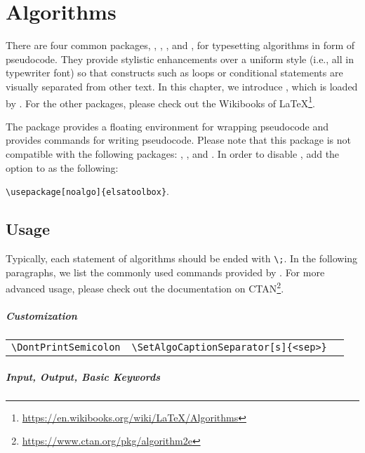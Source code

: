 \chapter{Algorithms}
\label{content:algorithms}

There are four common packages, , , , and , for typesetting algorithms in form of pseudocode. They provide stylistic enhancements over a uniform style (i.e., all in typewriter font) so that constructs such as loops or conditional statements are visually separated from other text. In this chapter, we introduce , which is loaded by \elsatoolbox{}. For the other packages, please check out the Wikibooks of \LaTeX{}\footnote{\url{https://en.wikibooks.org/wiki/LaTeX/Algorithms}}.

The  package provides a floating  environment for wrapping pseudocode and provides commands for writing pseudocode. Please note that this package is not compatible with the following packages: , , and . In order to disable , add the option  to \elsatoolbox{} as the following:

\begin{center}
    \verb|\usepackage[noalgo]{elsatoolbox}|.
\end{center}

\section*{Usage}

Typically, each statement of algorithms should be ended with \verb|\;|. In the following paragraphs, we list the commonly used commands provided by . For more advanced usage, please check out the documentation on CTAN\footnote{\url{https://www.ctan.org/pkg/algorithm2e}}.

\paragraph{Customization}

\begin{tabular}{lll}
    \verb|\DontPrintSemicolon| & \verb|\SetAlgoCaptionSeparator[s]{<sep>}|
\end{tabular}

\paragraph{Input, Output, Basic Keywords}

